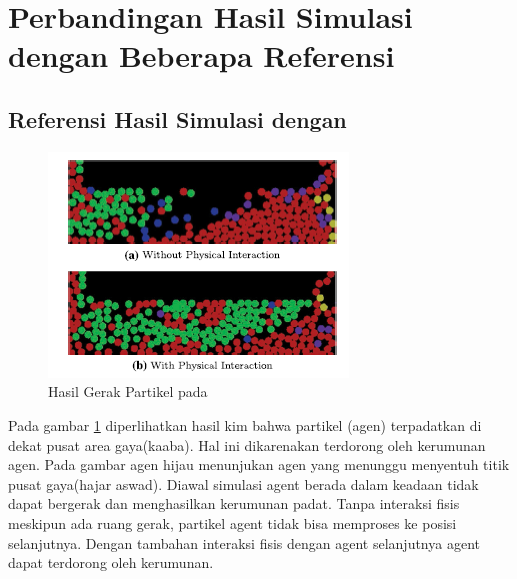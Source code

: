 \section{Perbandingan Hasil Simulasi dengan Beberapa Referensi}
\subsection{Referensi Hasil Simulasi dengan \citep{Kim2014} }%
\begin{figure}
\centering
\includegraphics[scale=0.6]{gambar/Kim2014}
\caption{Hasil Gerak Partikel pada \citep{Kim2014}}
\label{fig:figkim2014}
\end{figure}

\hspace{0.6cm} Pada gambar \ref{fig:figkim2014} diperlihatkan hasil kim bahwa partikel (agen) terpadatkan di dekat pusat area gaya(kaaba). Hal ini dikarenakan terdorong oleh kerumunan agen. Pada gambar agen hijau menunjukan agen yang menunggu menyentuh titik pusat gaya(hajar aswad). Diawal simulasi agent berada dalam keadaan tidak dapat bergerak dan menghasilkan kerumunan padat. Tanpa interaksi fisis meskipun ada ruang gerak, partikel agent tidak bisa memproses ke posisi selanjutnya. Dengan tambahan interaksi fisis dengan agent selanjutnya agent dapat terdorong oleh kerumunan.
